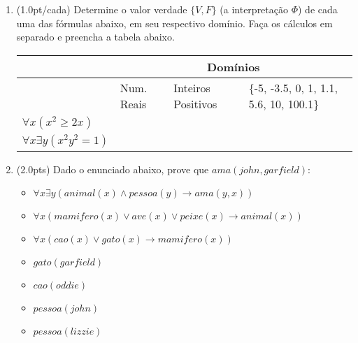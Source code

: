 \documentclass[12pt]{article}
\begin{document}
\begin{enumerate}

\item (1.0pt/cada) Determine o valor verdade $\{V, F \}$ (a interpretação $\Phi $)
de cada uma das fórmulas abaixo, em seu respectivo domínio.
Faça os cálculos em separado e preencha a tabela abaixo.

\begin{center}
\begin{tabular}{l|l|l|l} \hline \hline
 & \multicolumn{3}{c}{Domínios} \\ \hline
 & Num. Reais & Inteiros Positivos & \{-5, -3.5, 0, 1, 1.1, 5.6, 10, 100.1\} \\ \hline
$\forall x (x^2 \geq 2x)$ & & & \\ \hline
$\forall x \exists y (x^2y^2 = 1)$ & &  & \\ \hline \hline
\end{tabular}
\end{center}

\item (2.0pts) Dado o enunciado abaixo, prove que $ama(john, garfield)$:

\begin{itemize}
\item $\forall x \exists y (animal(x) \wedge pessoa(y) \rightarrow ama(y, x) ) $
\item $\forall x ( mamifero(x) \vee ave(x) \vee peixe(x) \rightarrow animal(x) )$
\item $\forall x ( cao(x) \vee gato(x) \rightarrow mamifero(x) )$
\item $gato(garfield)$
\item $cao(oddie)$
\item $pessoa(john)$
\item $pessoa(lizzie)$
\end{itemize}

\end{enumerate}

\newpage
\end{document}
